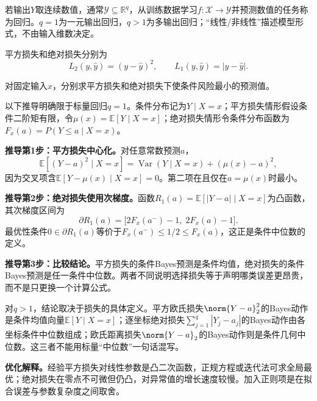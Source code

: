 \begin{definition}[回归任务]
若输出$Y$取连续数值，通常$\mathcal Y\subseteq\mathbb R^q$，从训练数据学习$f:\mathcal X\to\mathcal Y$并预测数值的任务称为回归。$q=1$为一元输出回归，$q>1$为多输出回归；“线性/非线性”描述模型形式，不由输入维数决定。
\end{definition}

平方损失和绝对损失分别为
\[
L_2(y,\hat y)=(y-\hat y)^2,\qquad
L_1(y,\hat y)=|y-\hat y|.
\]

\begin{derivationgoalbox}
对固定输入$x$，分别求平方损失和绝对损失下使条件风险最小的预测值。
\end{derivationgoalbox}
\begin{derivationprepbox}
以下推导明确限于标量回归$q=1$。条件分布记为$Y\mid X=x$；平方损失情形假设条件二阶矩有限，令$\mu(x)=\mathbb E[Y\mid X=x]$；绝对损失情形令条件分布函数为$F_x(a)=P(Y\le a\mid X=x)$。
\end{derivationprepbox}
\textbf{推导第1步：平方损失中心化。}对任意常数预测$a$，
\[
\mathbb E[(Y-a)^2\mid X=x]
=\operatorname{Var}(Y\mid X=x)+(\mu(x)-a)^2,
\]
因为交叉项含$\mathbb E[Y-\mu(x)\mid X=x]=0$。第二项在且仅在$a=\mu(x)$时最小。

\textbf{推导第2步：绝对损失使用次梯度。}函数$R_1(a)=\mathbb E[|Y-a|\mid X=x]$为凸函数，其次梯度区间为
\[
\partial R_1(a)=\bigl[2F_x(a^-)-1,\;2F_x(a)-1\bigr].
\]
最优性条件$0\in\partial R_1(a)$等价于$F_x(a^-)\le1/2\le F_x(a)$，这正是条件中位数的定义。

\textbf{推导第3步：比较结论。}平方损失的条件Bayes预测是条件均值，绝对损失的条件Bayes预测是任一条件中位数。两者不同说明选择损失等于声明哪类误差更昂贵，而不是只更换一个计算公式。

对$q>1$，结论取决于损失的具体定义。平方欧氏损失$\norm{Y-a}_2^2$的Bayes动作是条件均值向量$\mathbb E[Y\mid X=x]$；逐坐标绝对损失$\sum_{j=1}^q|Y_j-a_j|$的Bayes动作由各坐标条件中位数组成；欧氏距离损失$\norm{Y-a}_2$的Bayes动作则是条件几何中位数。这三者不能用标量“中位数”一句话混写。

\label{struct:V1-C11-CH16}
\begin{optimizationbox}
\textbf{优化解释。}经验平方损失对线性参数是凸二次函数，正规方程或迭代法可求全局最优；绝对损失在零点不可微但仍凸，对异常值的增长速度较慢。加入正则项是在拟合误差与参数复杂度之间取舍。
\end{optimizationbox}


